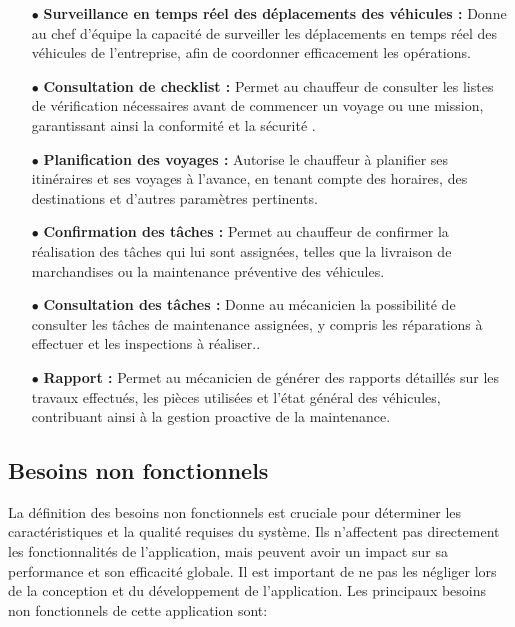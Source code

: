 \begin{itemize}
        \item[$\bullet$] \textbf {Surveillance en temps réel des déplacements des véhicules :} Donne au chef d'équipe la capacité de surveiller les déplacements en temps réel des véhicules de l'entreprise, afin de coordonner efficacement les opérations.\\
        
        \item[$\bullet$] \textbf {Consultation de checklist :} Permet au chauffeur de consulter les listes de vérification nécessaires avant de commencer un voyage ou une mission, garantissant ainsi la conformité et la sécurité .\\

        \item[$\bullet$] \textbf {Planification des voyages :} Autorise le chauffeur à planifier ses itinéraires et ses voyages à l'avance, en tenant compte des horaires, des destinations et d'autres paramètres pertinents. \\
          
        \item[$\bullet$] \textbf {Confirmation des tâches :} Permet au chauffeur de confirmer la réalisation des tâches qui lui sont assignées, telles que la livraison de marchandises ou la maintenance préventive des véhicules.\\
        
        \item[$\bullet$] \textbf {Consultation des tâches :} Donne au mécanicien la possibilité de consulter les tâches de maintenance assignées, y compris les réparations à effectuer et les inspections à réaliser..\\
        
        \item[$\bullet$] \textbf {Rapport :}  Permet au mécanicien de générer des rapports détaillés sur les travaux effectués, les pièces utilisées et l'état général des véhicules, contribuant ainsi à la gestion proactive de la maintenance.\\

        
\end{itemize}




    \subsection{Besoins non fonctionnels}
    La définition des besoins non fonctionnels est cruciale pour déterminer les caractéristiques et la qualité requises du système. Ils n’affectent pas directement les fonctionnalités de l'application, mais peuvent avoir un impact sur sa performance et son efficacité globale. Il est important de ne pas les négliger lors de la conception et du développement de l'application. Les principaux besoins non fonctionnels de cette application sont:
     
